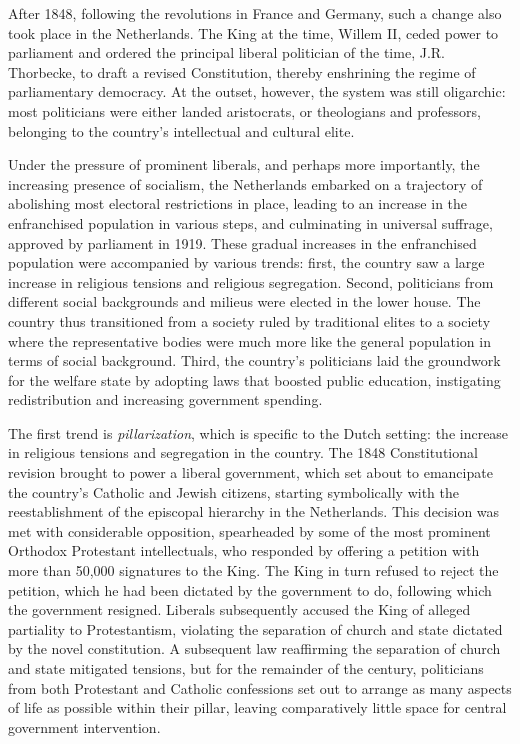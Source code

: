 After 1848, following the revolutions in France and Germany, such a change also took place in the Netherlands. The King at the time, Willem II, ceded power to parliament and ordered the principal liberal politician of the time, J.R. Thorbecke, to draft a revised Constitution, thereby enshrining the regime of parliamentary democracy. At the outset, however, the system was still oligarchic: most politicians were either landed aristocrats, or theologians and professors, belonging to the country's intellectual and cultural elite. 

Under the pressure of prominent liberals, and perhaps more importantly, the increasing presence of socialism, the Netherlands embarked on a trajectory of abolishing most electoral restrictions in place, leading to an increase in the enfranchised population in various steps, and culminating in universal suffrage, approved by parliament in 1919. These gradual increases in the enfranchised population were accompanied by various trends: first, the country saw a large increase in religious tensions and religious segregation. Second, politicians from different social backgrounds and milieus were elected in the lower house. The country thus transitioned from a society ruled by traditional elites to a society where the representative bodies were much more like the general population in terms of social background. \autocite{van1983toegang} Third, the country's politicians laid the groundwork for the welfare state by adopting laws that boosted public education, instigating redistribution and increasing government spending. 

The first trend is \textit{pillarization}, which is specific to the Dutch setting: the increase in religious tensions and segregation in the country. The 1848 Constitutional revision brought to power a liberal government, which set about to emancipate the country's Catholic and Jewish citizens, starting symbolically with the reestablishment of the episcopal hierarchy in the Netherlands. This decision was met with considerable opposition, spearheaded by some of the most prominent Orthodox Protestant intellectuals, who responded by offering a petition with more than 50,000 signatures to the King. The King in turn refused to reject the petition, which he had been dictated by the government to do, following which the government resigned. \autocite{oud1961honderd} Liberals subsequently accused the King of alleged partiality to Protestantism, violating the separation of church and state dictated by the novel constitution. A subsequent law reaffirming the separation of church and state mitigated tensions, but for the remainder of the century, politicians from both Protestant and Catholic confessions set out to arrange as many aspects of life as possible within their pillar, leaving comparatively little space for central government intervention. \autocite{van2013eerste}

